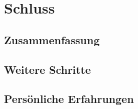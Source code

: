 \chapter{Schluss}
\label{cha:synopsis}

\section{Zusammenfassung}

\section{Weitere Schritte}

\section{Persönliche Erfahrungen}


